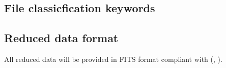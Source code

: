 \subsection{File classicfication keywords}
\label{ssec:file_classification_keywords}


\subsection{Reduced data format}
\label{ssec:reduced_data_format}

All reduced data will be provided in FITS format compliant with
\cite{ESO-products_standard} (, ).


